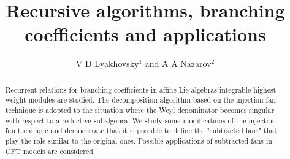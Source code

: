 \documentclass[12pt]{iopart}
\begin{document}
% 
% 
% 
\title{Recursive algorithms, branching coefficients and applications}
\author{V D Lyakhovsky$^1$ and A A Nazarov$^2$} 
\address{$^{1,2}$ Theoretical Department, SPb State University,
198904, Sankt-Petersburg, Russia }
% 

\begin{abstract}
  Recurrent relations for branching coefficients in affine Lie algebras integrable highest weight modules are studied. The decomposition algorithm based on the injection fan technique is adopted to the situation where the Weyl denominator becomes singular with respect to a reductive subalgebra. We study some modifications of the injection fan technique and demonstrate that it is possible to define the "subtracted fans" that play the role similar to the original ones. Possible applications of subtracted fans in CFT models are considered.
\end{abstract}
\submitto{\JPA}
\end{document}
